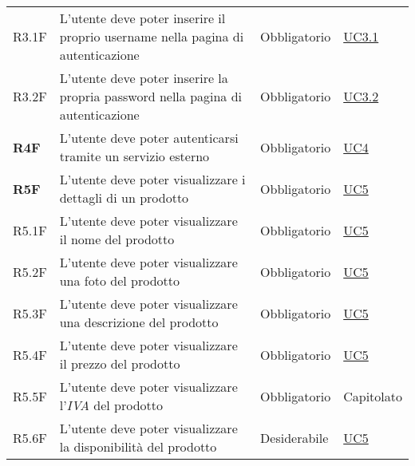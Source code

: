 \begin{center}
\begin{longtable}[!h]{p{50px} p{245px} p{75px} p{50px}}
        R3.1F                                 & L'utente deve poter inserire il proprio username nella pagina di autenticazione                            & Obbligatorio             & \hyperref[sec:UC3.1]{UC3.1}                  \\
        R3.2F                                 & L'utente deve poter inserire la propria password nella pagina di autenticazione                            & Obbligatorio             & \hyperref[sec:UC3.2]{UC3.2}                  \\
        \textbf{R4F}                          & L'utente deve poter autenticarsi tramite un servizio esterno                                               & Obbligatorio             & \hyperref[sec:UC4]{UC4}                      \\
        \textbf{R5F}                          & L'utente deve poter visualizzare i dettagli di un prodotto                                                 & Obbligatorio             & \hyperref[sec:UC5]{UC5}                      \\
        R5.1F                                 & L'utente deve poter visualizzare il nome del prodotto                                                      & Obbligatorio             & \hyperref[sec:UC5]{UC5}                      \\
        R5.2F                                 & L'utente deve poter visualizzare una foto del prodotto                                                     & Obbligatorio             & \hyperref[sec:UC5]{UC5}                      \\
        R5.3F                                 & L'utente deve poter visualizzare una descrizione del prodotto                                              & Obbligatorio             & \hyperref[sec:UC5]{UC5}                      \\
        R5.4F                                 & L'utente deve poter visualizzare il prezzo del prodotto                                                    & Obbligatorio             & \hyperref[sec:UC5]{UC5}                      \\
        R5.5F                                 & L'utente deve poter visualizzare l'\textit{IVA} del prodotto                                               & Obbligatorio             & Capitolato                                   \\
        R5.6F                                 & L'utente deve poter visualizzare la disponibilità del prodotto                                             & Desiderabile             & \hyperref[sec:UC5]{UC5}                      \\

\end{longtable}
\end{center}
